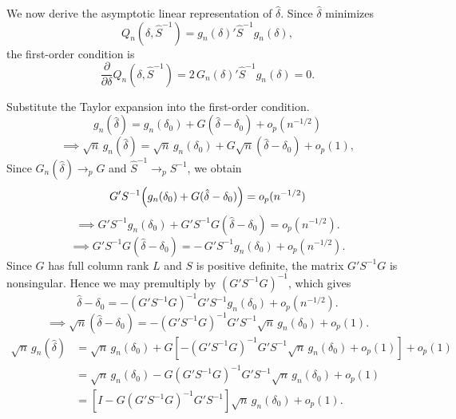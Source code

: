 \documentclass[12pt, letterpaper, onecolumn]{exam}
\begin{document}
\begin{solution}
    We now derive the asymptotic linear representation of \(\hat\delta\). Since \(\hat\delta\) minimizes
    $$
        Q_n(\delta,\hat S^{-1})=g_n(\delta)'\hat S^{-1}g_n(\delta),
    $$
    the first-order condition is
    $$
        \frac{\partial}{\partial\delta}Q_n(\delta,\hat S^{-1})
        =
        2\,G_n(\delta)'\hat S^{-1}g_n(\delta)=0.
    $$

    Substitute the Taylor expansion into the first-order condition.
    $$
        g_n(\hat\delta)=g_n(\delta_0)+G(\hat\delta-\delta_0)+o_p(n^{-1/2})
    $$
    $$
        \implies \sqrt n\,g_n(\hat\delta)
        =
        \sqrt n\,g_n(\delta_0)+G\sqrt n(\hat\delta-\delta_0)+o_p(1),
    $$
    Since \(G_n(\hat\delta)\to_p G\) and \(\hat S^{-1}\to_p S^{-1}\), we obtain
    $$
        G'S^{-1}\Bigl(g_n(\delta_0)+G(\hat\delta-\delta_0)\Bigr)=o_p(n^{-1/2})\\
    $$
    $$
        \implies G'S^{-1}g_n(\delta_0)+G'S^{-1}G(\hat\delta-\delta_0)=o_p(n^{-1/2}).
    $$
    $$
        \implies G'S^{-1}G(\hat\delta-\delta_0)=-\,G'S^{-1}g_n(\delta_0)+o_p(n^{-1/2}).
    $$
    Since \(G\) has full column rank \(L\) and \(S\) is positive definite, the matrix $G'S^{-1}G$ is nonsingular. Hence we may premultiply by \((G'S^{-1}G)^{-1}\), which gives
    $$
        \hat\delta-\delta_0
        =
        -(G'S^{-1}G)^{-1}G'S^{-1}g_n(\delta_0)+o_p(n^{-1/2}).
    $$
    $$
        \implies \sqrt n(\hat\delta-\delta_0)
        =
        -(G'S^{-1}G)^{-1}G'S^{-1}\sqrt n\,g_n(\delta_0)+o_p(1).
    $$
    \begin{align*}
        \sqrt n\,g_n(\hat\delta)
         & =
        \sqrt n\,g_n(\delta_0)
        +
        G\left[
        -(G'S^{-1}G)^{-1}G'S^{-1}\sqrt n\,g_n(\delta_0)+o_p(1)
        \right]
        +o_p(1) \\
         & =
        \sqrt n\,g_n(\delta_0)
        -
        G(G'S^{-1}G)^{-1}G'S^{-1}\sqrt n\,g_n(\delta_0)
        +o_p(1) \\
         & =
        \left[
        I-G(G'S^{-1}G)^{-1}G'S^{-1}
        \right]
        \sqrt n\,g_n(\delta_0)+o_p(1).
    \end{align*}


\end{solution}
\end{document}
